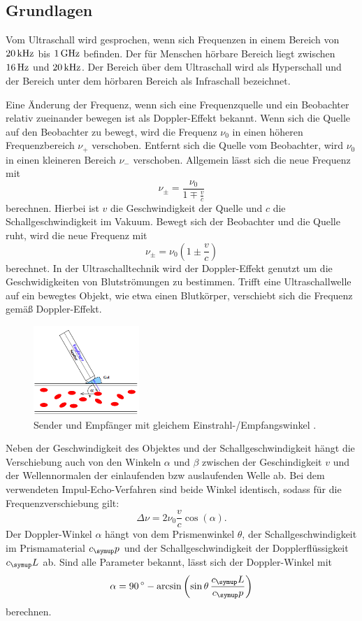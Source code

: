 \subsection{Grundlagen}
Vom Ultraschall wird gesprochen, wenn sich Frequenzen in einem Bereich von
$20\,\si{\kilo\hertz}$ bis $1\,\si{\giga\hertz}$ befinden. Der für Menschen hörbare Bereich liegt zwischen
$16\,\si{\hertz}$ und $20\,\si{\kilo\hertz}$. Der Bereich über dem Ultraschall wird als Hyperschall und
der Bereich unter dem hörbaren Bereich als Infraschall bezeichnet.

Eine Änderung der Frequenz, wenn sich eine Frequenzquelle und ein Beobachter
relativ zueinander bewegen ist als Doppler-Effekt bekannt. Wenn sich die Quelle
auf den Beobachter zu bewegt, wird die Frequenz $\nu_0$ in einen höheren
Frequenzbereich $\nu_+$ verschoben. Entfernt sich die Quelle vom Beobachter,
wird $\nu_0$ in einen kleineren Bereich $\nu_-$ verschoben. Allgemein lässt
sich die neue Frequenz mit
\begin{equation}
  \nu_\pm = \frac{\nu_0}{1\mp\frac{v}{c}}
\end{equation}
berechnen. Hierbei ist $v$ die Geschwindigkeit der Quelle und $c$ die
Schallgeschwindigkeit im Vakuum.
Bewegt sich der Beobachter und die Quelle ruht, wird die neue Frequenz mit
\begin{equation}
  \nu_\pm=\nu_0\left(1\pm\frac{v}{c}\right)
\end{equation}
berechnet. In der Ultraschalltechnik wird der Doppler-Effekt genutzt um die
Geschwidigkeiten von Blutströmungen zu bestimmen. Trifft eine Ultraschallwelle
auf ein bewegtes Objekt, wie etwa einen Blutkörper, verschiebt sich die Frequenz
gemäß Doppler-Effekt.
\begin{figure}
  \centering
  \includegraphics[width=4cm]{bilder/sender.png}
  \caption{Sender und Empfänger mit gleichem Einstrahl-/Empfangswinkel \cite{us3}.}
\end{figure}
Neben der Geschwindigkeit des Objektes und der
Schallgeschwindigkeit hängt die Verschiebung auch von den Winkeln $\alpha$ und
$\beta$ zwischen der Geschindigkeit $v$ und der Wellennormalen der einlaufenden
bzw auslaufenden Welle ab. Bei dem verwendeten Impul-Echo-Verfahren sind beide
Winkel identisch, sodass für die Frequenzverschiebung gilt:
\begin{equation}
  \Delta\nu = 2\nu_0\frac{v}{c}\cos(\alpha).
  \label{eqn:deltanu}
\end{equation}
Der Doppler-Winkel $\alpha$ hängt von dem Prismenwinkel $\theta$, der
Schallgeschwindigkeit im Prismamaterial $c_\su{p}$ und der Schallgeschwindigkeit
der Dopplerflüssigkeit $c_\su{L}$ ab. Sind alle Parameter bekannt, lässt sich
der Doppler-Winkel mit
\begin{equation}
  \alpha = 90\dgr -\arcsin\left(\sin\theta\,\frac{c_\su{L}}{c_\su{p}}\right)
  \label{eqn:alpha}
\end{equation}
berechnen.
